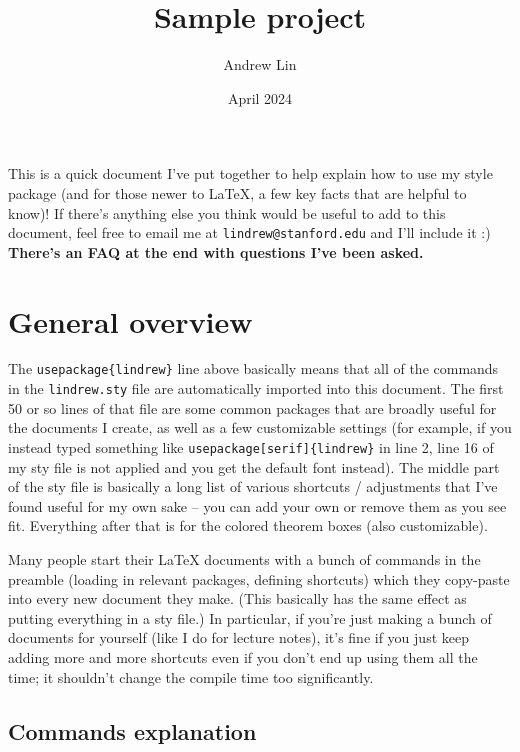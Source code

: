 \documentclass[11pt]{article}
\title{Sample project}
\author{Andrew Lin}
\date{April 2024}
\begin{document}
\maketitle

This is a quick document I've put together to help explain how to use my style package (and for those newer to LaTeX, a few key facts that are helpful to know)! If there's anything else you think would be useful to add to this document, feel free to email me at \texttt{lindrew@stanford.edu} and I'll include it :) \textbf{There's an FAQ at the end with questions I've been asked.}

\section{General overview}

The \texttt{usepackage\{lindrew\}} line above basically means that all of the commands in the \texttt{lindrew.sty} file are automatically imported into this document. The first 50 or so lines of that file are some common packages that are broadly useful for the documents I create, as well as a few customizable settings (for example, if you instead typed something like \texttt{usepackage[serif]\{lindrew\}} in line 2, line 16 of my sty file is not applied and you get the default font instead). The middle part of the sty file is basically a long list of various shortcuts / adjustments that I've found useful for my own sake -- you can add your own or remove them as you see fit. Everything after that is for the colored theorem boxes (also customizable).

Many people start their LaTeX documents with a bunch of commands in the preamble (loading in relevant packages, defining shortcuts) which they copy-paste into every new document they make. (This basically has the same effect as putting everything in a sty file.) In particular, if you're just making a bunch of documents for yourself (like I do for lecture notes), it's fine if you just keep adding more and more shortcuts even if you don't end up using them all the time; it shouldn't change the compile time too significantly.

\subsection{Commands explanation}
\end{document}

